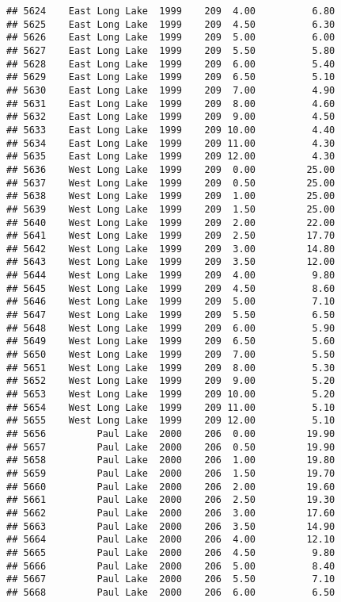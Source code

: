 \documentclass[
]{article}
\begin{document}
\begin{verbatim}
## 5624    East Long Lake  1999    209  4.00          6.80
## 5625    East Long Lake  1999    209  4.50          6.30
## 5626    East Long Lake  1999    209  5.00          6.00
## 5627    East Long Lake  1999    209  5.50          5.80
## 5628    East Long Lake  1999    209  6.00          5.40
## 5629    East Long Lake  1999    209  6.50          5.10
## 5630    East Long Lake  1999    209  7.00          4.90
## 5631    East Long Lake  1999    209  8.00          4.60
## 5632    East Long Lake  1999    209  9.00          4.50
## 5633    East Long Lake  1999    209 10.00          4.40
## 5634    East Long Lake  1999    209 11.00          4.30
## 5635    East Long Lake  1999    209 12.00          4.30
## 5636    West Long Lake  1999    209  0.00         25.00
## 5637    West Long Lake  1999    209  0.50         25.00
## 5638    West Long Lake  1999    209  1.00         25.00
## 5639    West Long Lake  1999    209  1.50         25.00
## 5640    West Long Lake  1999    209  2.00         22.00
## 5641    West Long Lake  1999    209  2.50         17.70
## 5642    West Long Lake  1999    209  3.00         14.80
## 5643    West Long Lake  1999    209  3.50         12.00
## 5644    West Long Lake  1999    209  4.00          9.80
## 5645    West Long Lake  1999    209  4.50          8.60
## 5646    West Long Lake  1999    209  5.00          7.10
## 5647    West Long Lake  1999    209  5.50          6.50
## 5648    West Long Lake  1999    209  6.00          5.90
## 5649    West Long Lake  1999    209  6.50          5.60
## 5650    West Long Lake  1999    209  7.00          5.50
## 5651    West Long Lake  1999    209  8.00          5.30
## 5652    West Long Lake  1999    209  9.00          5.20
## 5653    West Long Lake  1999    209 10.00          5.20
## 5654    West Long Lake  1999    209 11.00          5.10
## 5655    West Long Lake  1999    209 12.00          5.10
## 5656         Paul Lake  2000    206  0.00         19.90
## 5657         Paul Lake  2000    206  0.50         19.90
## 5658         Paul Lake  2000    206  1.00         19.80
## 5659         Paul Lake  2000    206  1.50         19.70
## 5660         Paul Lake  2000    206  2.00         19.60
## 5661         Paul Lake  2000    206  2.50         19.30
## 5662         Paul Lake  2000    206  3.00         17.60
## 5663         Paul Lake  2000    206  3.50         14.90
## 5664         Paul Lake  2000    206  4.00         12.10
## 5665         Paul Lake  2000    206  4.50          9.80
## 5666         Paul Lake  2000    206  5.00          8.40
## 5667         Paul Lake  2000    206  5.50          7.10
## 5668         Paul Lake  2000    206  6.00          6.50

\end{verbatim}
\end{document}
